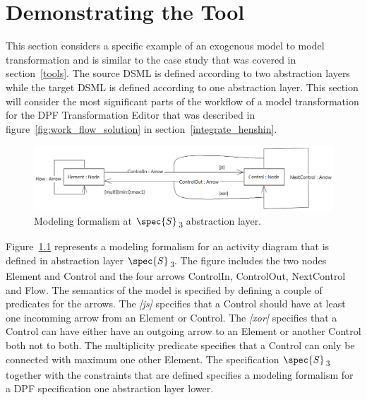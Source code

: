 
\chapter{Demonstrating the Tool} %

\label{Chapter6} %


This section considers a specific example of an exogenous model to model
transformation and is similar to the case study that was covered in
section~\ref{tools}. The source DSML is defined according to two abstraction
layers while the target DSML is defined according to one abstraction layer. This
section will consider the most significant parts of the workflow of a model
transformation for the DPF Transformation Editor that was described in
figure~\ref{fig:work_flow_solution} in section~\ref{integrate_henshin}.

\begin{figure}[H]
	\centering
	\includegraphics[scale=0.5]{./Figures/DPFactivityMetamodel_1.png}
	\caption[Source modeling formalism one abstraction layer higher]
	{Modeling formalism at $\spec{S}$\textsubscript{3} abstraction layer.}
	\label{fig:source_DSL_1}
\end{figure}

Figure~\ref{fig:source_DSL_1} represents a modeling formalism for an activity
diagram that is defined in abstraction layer $\spec{S}$\textsubscript{3}. The
figure includes the two nodes Element and Control and the four arrows ControlIn,
ControlOut, NextControl and Flow. The semantics of the model is specified by
defining a couple of predicates for the arrows. The \textit{[js]} specifies that
a Control should have at least one incomming arrow from an Element or Control.
The \textit{[xor]} specifies that a Control can have either have an outgoing
arrow to an Element or another Control both not to both. The multiplicity
predicate specifies that a Control can only be connected with maximum one other
Element. The specification $\spec{S}$\textsubscript{3} together with the
constraints that are defined specifies a modeling formalism for a DPF
specification one abstraction layer lower.

